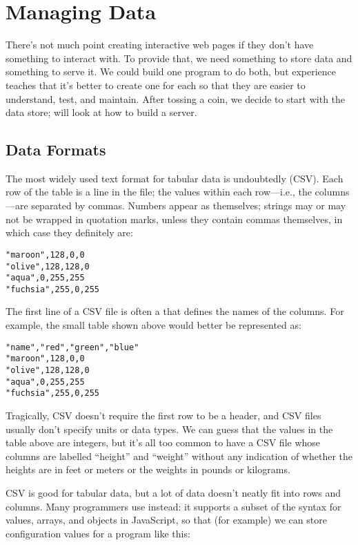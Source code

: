 \chapter{Managing Data}\label{s:dataman}

There's not much point creating interactive web pages
if they don't have something to interact with.
To provide that,
we need something to store data and something to serve it.
We could build one program to do both,
but experience teaches that it's better to create one for each
so that they are easier to understand, test, and maintain.
After tossing a coin,
we decide to start with the data store;
 will look at how to build a server.

\section{Data Formats}\label{s:dataman-formats}

The most widely used text format for tabular data is undoubtedly
 (CSV).
Each row of the table is a line in the file;
the values within each row---i.e., the columns---are separated by commas.
Numbers appear as themselves;
strings may or may not be wrapped in quotation marks,
unless they contain commas themselves,
in which case they definitely are:

\begin{verbatim}
"maroon",128,0,0
"olive",128,128,0
"aqua",0,255,255
"fuchsia",255,0,255
\end{verbatim}

The first line of a CSV file is often a 
that defines the names of the columns.
For example,
the small table shown above would better be represented as:

\begin{verbatim}
"name","red","green","blue"
"maroon",128,0,0
"olive",128,128,0
"aqua",0,255,255
"fuchsia",255,0,255
\end{verbatim}

Tragically,
CSV doesn't require the first row to be a header,
and CSV files usually don't specify units or data types.
We can guess that the values in the table above are integers,
but it's all too common to have a CSV file whose columns are labelled ``height'' and ``weight''
without any indication of whether the heights are in feet or meters
or the weights in pounds or kilograms.

CSV is good for tabular data,
but a lot of data doesn't neatly fit into rows and columns.
Many programmers use  instead:
it supports a subset of the syntax for values, arrays, and objects in JavaScript,
so that (for example)
we can store configuration values for a program like this:

